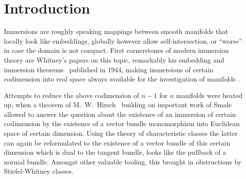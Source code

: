 % 

\chapter*{Introduction}


Immersions are roughly speaking mappings between smooth
manifolds that locally look like embeddings, globally however
allow self-intersection, or \enquote{worse} in case the domain is not
compact.
First cornerstones of modern immersion theory are Whitney's papers on this
topic, remarkably his embedding and immersion
theorems~\cite{whitneyimmersiontheorem} published in 1944, making
immersions of certain codimension into real space always available for the
investigation of manifolds
\cite{immersiontheoryhistory,hirsch}.

Attempts to reduce the above codimension of $n-1$ for $n$ manifolds
were heated up, when a theorem of
M.~W.~Hirsch~\cite{hirschimmersions} building on important work of
Smale allowed to answer the question about the existence of an
immersion of certain codimension by the 
existence of a vector bundle monomorphism into Euclidean space of
certain dimension.
Using the theory of characteristic classes the latter can again be
reformulated to the existence of a vector bundle of this certain
dimension which is dual to the tangent bundle, \idest looks
like the pullback of a normal bundle.
Amongst other valuable tooling, this brought in obstructions by
Stiefel-Whitney classes.

